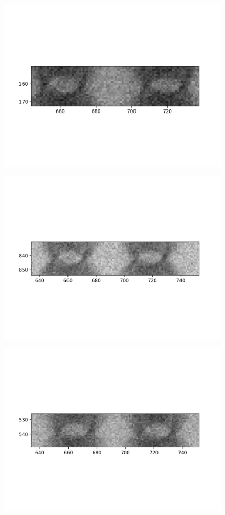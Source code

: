 \documentclass[10pt,a4paper]{article}
\begin{document}
	\begin{figure}[h]
		\includegraphics{data/image_stamps/f9}
	\end{figure}
	\begin{figure}[h]
		\includegraphics{data/image_stamps/f10}
	\end{figure}
	\begin{figure}[h]
		\includegraphics{data/image_stamps/f11}
	\end{figure}
\end{document}
